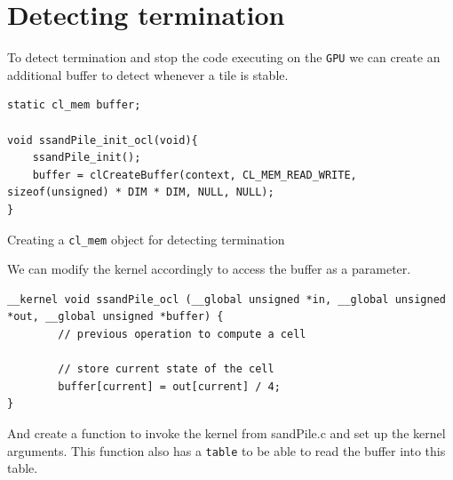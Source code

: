 \documentclass{report}
\def\GPU{\texttt{GPU}}
\begin{document}
\section{Detecting termination}
To detect termination and stop the code executing on the \GPU{} we can create an additional
buffer to detect whenever a tile is stable.

\begin{listing}[H]
	\begin{verbatim}
static cl_mem buffer;

void ssandPile_init_ocl(void){
    ssandPile_init();
    buffer = clCreateBuffer(context, CL_MEM_READ_WRITE, sizeof(unsigned) * DIM * DIM, NULL, NULL);
}
\end{verbatim}
	\caption{Creating a \texttt{cl\_mem} object for detecting termination}
\end{listing}

We can modify the kernel accordingly to access the buffer as a parameter.

\begin{verbatim}
__kernel void ssandPile_ocl (__global unsigned *in, __global unsigned *out, __global unsigned *buffer) {
        // previous operation to compute a cell

        // store current state of the cell
        buffer[current] = out[current] / 4;
}
\end{verbatim}

And create a function to invoke the kernel from sandPile.c and set up the kernel arguments.
This function also has a \texttt{table} to be able to read the buffer into this table.
\end{document}
